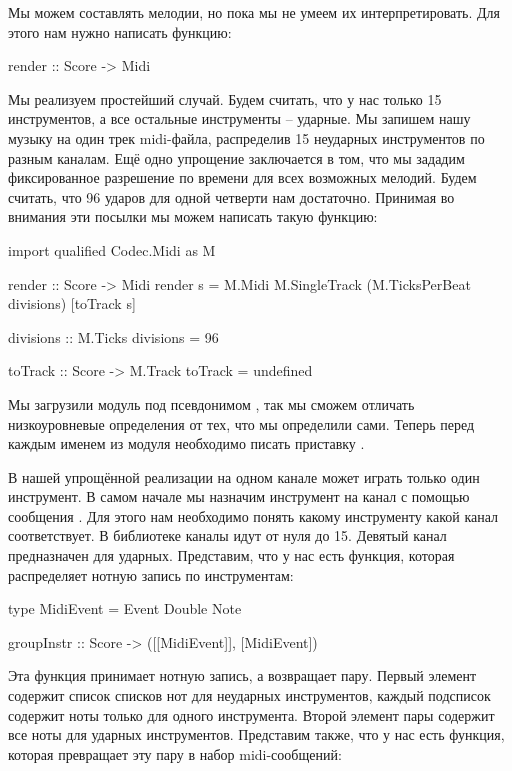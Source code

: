 Мы можем составлять мелодии, но пока мы не умеем их
интерпретировать. Для этого нам нужно написать функцию:

\begin{code}
render :: Score -> Midi
\end{code}

Мы реализуем простейший случай. Будем считать, что
у нас только 15 инструментов, а все остальные инструменты -- 
ударные. Мы запишем нашу музыку на один трек midi-файла,
распределив 15 неударных инструментов по разным каналам. 
Ещё одно упрощение заключается в том, что мы зададим 
фиксированное разрешение по времени для всех возможных
мелодий. Будем считать, что 96 ударов для одной четверти
нам достаточно. Принимая во внимания эти посылки мы можем 
написать такую функцию:

\begin{code}
import qualified Codec.Midi as M

render :: Score -> Midi
render s = M.Midi M.SingleTrack (M.TicksPerBeat divisions) [toTrack s]

divisions :: M.Ticks
divisions = 96

toTrack :: Score -> M.Track 
toTrack = undefined
\end{code}

Мы загрузили модуль  под псевдонимом ,
так мы сможем отличать низкоуровневые определения от тех,
что мы определили сами. Теперь перед каждым именем 
из модуля  необходимо писать приставку .

В нашей упрощённой реализации на одном канале может
играть только один инструмент. В самом начале мы назначим 
инструмент на канал с помощью сообщения .
Для этого нам необходимо понять какому инструменту какой 
канал соответствует. В библиотеке  каналы идут 
от нуля до 15. Девятый канал предназначен для ударных.
Представим, что у нас есть функция, которая распределяет
нотную запись по инструментам:

\begin{code}
type MidiEvent = Event Double Note

groupInstr :: Score -> ([[MidiEvent]], [MidiEvent])
\end{code}

Эта функция принимает нотную запись, а возвращает
пару. Первый элемент содержит список списков нот
для неударных инструментов, каждый подсписок содержит
ноты только для одного инструмента. Второй элемент
пары содержит все ноты для ударных инструментов.
Представим также, что у нас есть функция, которая 
превращает эту пару в набор midi-сообщений:

